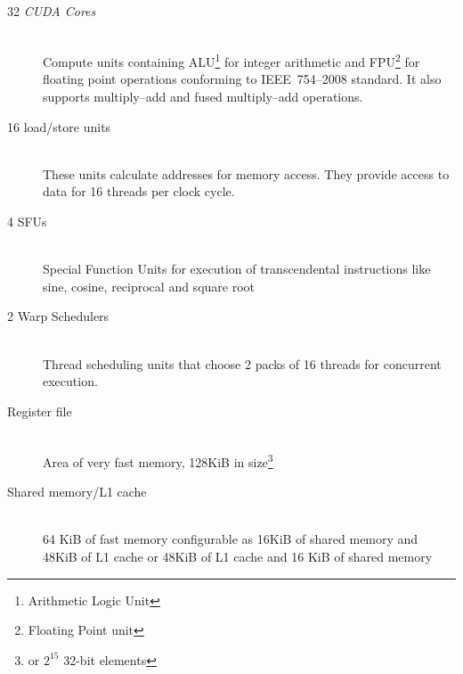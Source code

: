 \begin{description}
  \item[32 \emph{CUDA Cores}] \hfill \\
    Compute units containing ALU\footnote{Arithmetic Logic Unit}
    for integer arithmetic and FPU\footnote{Floating Point unit} for floating point
    operations conforming to IEEE~754--2008 standard. It also supports multiply--add
    and fused multiply--add operations.
  \item[16 load/store units] \hfill \\
    These units calculate addresses for memory access. They provide access to
    data for 16 threads per clock cycle.
  \item[4 SFUs] \hfill \\
    Special Function Units for execution of transcendental instructions
    like sine, cosine, reciprocal and square root
  \item[2 Warp Schedulers] \hfill \\
    Thread scheduling units that choose 2 packs of 16 threads for concurrent
    execution.
  \item[Register file] \hfill \\
    Area of very fast memory, 128KiB in size\footnote{or $2^{15}$ 32-bit elements}
  \item[Shared memory/L1 cache] \hfill \\
    64 KiB of fast memory configurable as
    16KiB of shared memory and 48KiB of L1 cache or 48KiB of L1 cache and 16 KiB
    of shared memory
\end{description}
